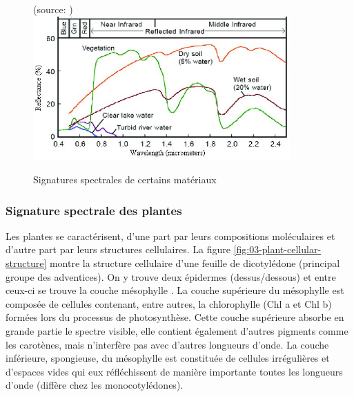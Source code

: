 \documentclass[../thesis.tex]{subfiles}
\begin{document}
    \begin{figure}[H]
        \centering
        {\scriptsize (source: \cite{Mercan2011})} \\
        \includegraphics[height=5.5cm]{img/biblio/surface-spectral-signature} \\
        \caption{Signatures spectrales de certains matériaux}
        \label{fig:03-surface-spectral-signature}
    \end{figure}
    
    \subsubsection{Signature spectrale des plantes} 
    Les plantes se caractérisent, d'une part par leurs compositions moléculaires et d'autre part par leurs structures cellulaires. La figure \ref{fig:03-plant-cellular-structure} montre la structure cellulaire d'une feuille de dicotylédone (principal groupe des adventices). On y trouve deux épidermes (dessus/dessous) et entre ceux-ci se trouve la couche mésophylle \cite{ben2016utilisation}. La couche supérieure du mésophylle est composée de cellules contenant, entre autres, la chlorophylle (Chl a et Chl b) formées lors du processus de photosynthèse. Cette couche supérieure absorbe en grande partie le spectre visible, elle contient également d'autres pigments comme les carotènes, mais n'interfère pas avec d'autres longueurs d'onde. La couche inférieure, spongieuse, du mésophylle est constituée de cellules irrégulières et d'espaces vides qui eux réfléchissent de manière importante toutes les longueurs d'onde (diffère chez les monocotylédones).
    
\end{document}
